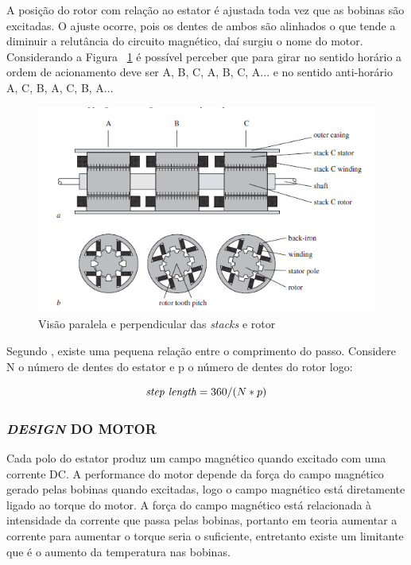A posição do rotor com relação ao estator é ajustada toda vez que as bobinas são excitadas. O ajuste ocorre, pois os dentes de ambos são alinhados o que tende a diminuir a relutância do circuito magnético, daí surgiu o nome do motor. Considerando a Figura ~\ref{fig:visaomotorpasso} é possível perceber que para girar no sentido horário a ordem de acionamento deve ser A, B, C, A, B, C, A... e no sentido anti-horário A, C, B, A, C, B, A...

\begin{figure}[htp]
	\centering
	\includegraphics[scale=1]{images/visao_motor_passo.png}
	\caption{Visão paralela e perpendicular das \emph{stacks} e rotor}	
	\label{fig:visaomotorpasso}	
\end{figure}

\newpage Segundo \cite{acarnley2002stepping}, existe uma pequena relação entre o comprimento do passo. Considere N o número de dentes do estator e p o número de dentes do rotor logo: 

\begin{equation}
  \emph{step length} = 360/(N * p)
\end{equation}

\subsubsection{\emph{DESIGN} DO MOTOR}
Cada polo do estator produz um campo magnético quando excitado com uma corrente DC. A performance do motor depende da força do campo magnético gerado pelas bobinas quando excitadas, logo o campo magnético está diretamente ligado ao torque do motor. A força do campo magnético está relacionada à intensidade da corrente que passa pelas bobinas, portanto em teoria aumentar a corrente para aumentar o torque seria o suficiente, entretanto existe um limitante que é o aumento da temperatura nas bobinas.

